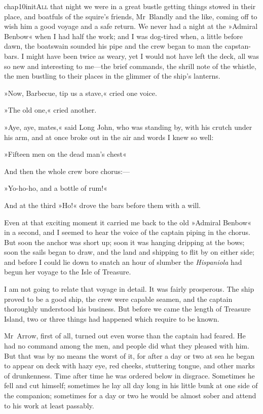 
\lettrine[lines=5,image=true,findent=2pt]{chap10initA}{ll} that night we were in a great bustle getting things stowed in their place, and boatfuls of the squire's friends, Mr~Bland\-ly and the like, coming off to wish him a good voyage and a safe return. We never had a night at the »Admiral Benbow« when I had half the work; and I was dog-tired when, a little before dawn, the boatswain sounded his pipe and the crew began to man the capstan-bars. I might have been twice as weary, yet I would not have left the deck, all was so new and interesting to me—the brief commands, the shrill note of the whistle, the men bustling to their places in the glimmer of the ship's lanterns.

»Now, Barbecue, tip us a stave,« cried one voice.

»The old one,« cried another.

»Aye, aye, mates,« said Long John, who was standing by, with his crutch under his arm, and at once broke out in the air and words I knew so well:

»Fifteen men on the dead man's chest\longdash«

And then the whole crew bore chorus:—

»Yo-ho-ho, and a bottle of rum!«

And at the third »Ho!« drove the bars before them with a will.

Even at that exciting moment it carried me back to the old »Admiral Benbow« in a second, and I seemed to hear the voice of the captain piping in the chorus. But soon the anchor was short up; soon it was hanging dripping at the bows; soon the sails began to draw, and the land and shipping to flit by on either side; and before I could lie down to snatch an hour of slumber the \textit{Hispaniola} had begun her voyage to the Isle of Treasure.

I am not going to relate that voyage in detail. It was fairly prosperous. The ship proved to be a good ship, the crew were capable seamen, and the captain thoroughly understood his business. But before we came the length of Treasure Island, two or three things had happened which require to be known.

Mr~Arrow, first of all, turned out even worse than the captain had feared. He had no command among the men, and people did what they pleased with him. But that was by no means the worst of it, for after a day or two at sea he began to appear on deck with hazy eye, red cheeks, stuttering tongue, and other marks of drunkenness. Time after time he was ordered below in disgrace. Sometimes he fell and cut himself; sometimes he lay all day long in his little bunk at one side of the companion; sometimes for a day or two he would be almost sober and attend to his work at least passably.

